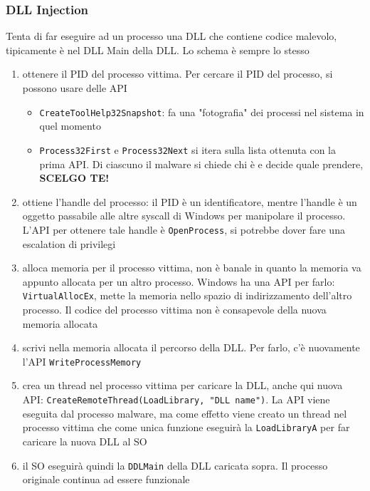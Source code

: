 \documentclass[12pt, oneside]{extbook}
\begin{document}
\subsubsection{DLL Injection}
Tenta di far eseguire ad un processo una DLL che contiene codice malevolo, tipicamente è nel DLL Main della DLL. Lo schema è sempre lo stesso
\begin{enumerate}
	\item ottenere il PID del processo vittima. Per cercare il PID del processo, si possono usare delle API
	\begin{itemize}
		\item \texttt{CreateToolHelp32Snapshot}: fa una "fotografia" dei processi nel sistema in quel momento
		\item \texttt{Process32First} e \texttt{Process32Next} si itera sulla lista ottenuta con la prima API. Di ciascuno il malware si chiede chi è e decide quale prendere, \textbf{\textsf{SCELGO TE!}}
	\end{itemize}
	\item ottiene l'handle del processo: il PID è un identificatore, mentre l'handle è un oggetto passabile alle altre syscall di Windows per manipolare il processo. L'API per ottenere tale handle è \texttt{OpenProcess}, si potrebbe dover fare una escalation di privilegi
	\item alloca memoria per il processo vittima, non è banale in quanto la memoria va appunto allocata per un altro processo. Windows ha una API per farlo: \texttt{VirtualAllocEx}, mette la memoria nello spazio di indirizzamento dell'altro processo. Il codice del processo vittima non è consapevole della nuova memoria allocata
	\item scrivi nella memoria allocata il percorso della DLL. Per farlo, c'è nuovamente l'API \texttt{WriteProcessMemory}
	\item crea un thread nel processo vittima per caricare la DLL, anche qui nuova API: \texttt{CreateRemoteThread(LoadLibrary, "DLL name")}. La API viene eseguita dal processo malware, ma come effetto viene creato un thread nel processo vittima che come unica funzione eseguirà la \texttt{LoadLibraryA} per far caricare la nuova DLL al SO
	\item il SO eseguirà quindi la \texttt{DDLMain} della DLL caricata sopra. Il processo originale continua ad essere funzionale
\end{enumerate}
\end{document}
